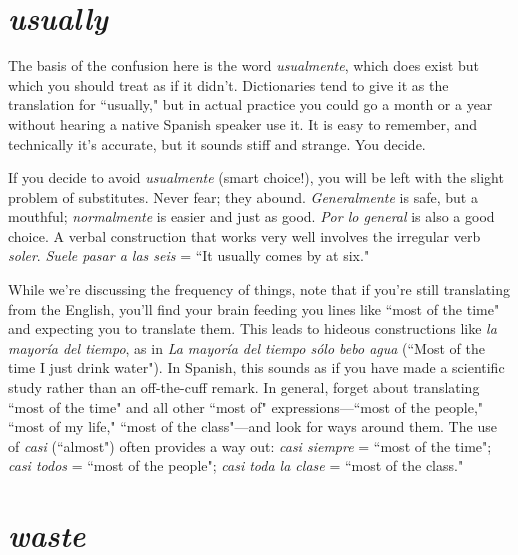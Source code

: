 \section{\emph{usually}}

The basis of the confusion here is the word \emph{usualmente},
which does exist but which you should treat as if it didn't. Dictionaries tend to give it as the translation for ``usually," but in actual practice you could go a month or a year without hearing a native Spanish
speaker use it. It is easy to remember, and technically it's accurate, but
it sounds stiff and strange. You decide.

If you decide to avoid \emph{usualmente} (smart choice!), you will be
left with the slight problem of substitutes. Never fear; they abound.
\emph{Generalmente} is safe, but a mouthful; \emph{normalmente} is easier and just
as good. \emph{Por lo general} is also a good choice. A verbal construction that
works very well involves the irregular verb \emph{soler}. \emph{Suele pasar a las seis}
= ``It usually comes by at six."

While we're discussing the frequency of things, note that if
you're still translating from the English, you'll find your brain feeding
you lines like ``most of the time" and expecting you to translate them.
This leads to hideous constructions like \emph{la mayoría del tiempo}, as in
\emph{La mayoría del tiempo sólo bebo agua} (``Most of the time I just drink
water"). In Spanish, this sounds as if you have made a scientific study
rather than an off-the-cuff remark. In general, forget about translating
``most of the time" and all other ``most of" expressions---``most of the
people," ``most of my life," ``most of the class"---and look for ways
around them. The use of \emph{casi} (``almost") often provides a way out: \emph{casi
	siempre} = ``most of the time"; \emph{casi todos} = ``most of the people";
\emph{casi toda la clase} = ``most of the class."

\section{\emph{waste}}


